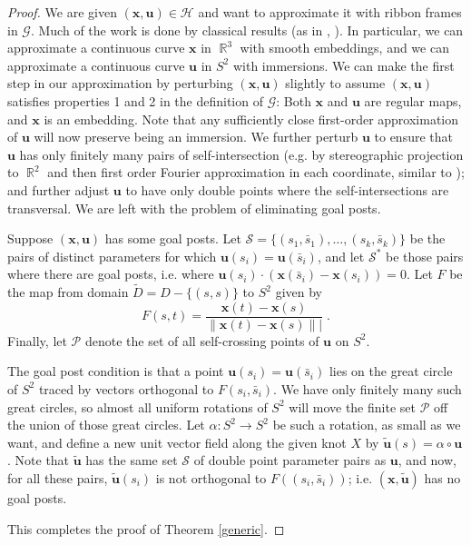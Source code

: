 \documentclass[12pt]{article}
\numberwithin{equation}{subsection}
\theoremstyle{definition}
\numberwithin{lem}{section}
\DeclareMathOperator{\R}{\mathbb{R}}
\def\uu{\mathbf{u}}
\def\x{\mathbf{x}}
\def\bs{\bar{s}}
\def\G{\mathcal{G}}
\def\S{\mathcal{S}}
\def\H{\mathcal{H}}
\def\P{\mathcal{P}}
\begin{document}
\begin{proof}
We are given $(\x, \uu) \in \H$ and want to approximate it with ribbon frames in $\G$. Much of the work is done by classical results (as in \cite{HWhit36}, \cite{JMil07}).  In particular, we can approximate a continuous curve $\x$ in $\R^3$ with smooth embeddings, and we can approximate a continuous curve $\uu$ in $S^2$ with immersions. We can make the first step in our approximation by perturbing $(\x,\uu)$  slightly to assume $(\x,\uu)$ satisfies properties 1 and 2 in the definition of $\G$: Both $\x$ and $\uu$ are regular maps, and $\x$ is an embedding. Note that any sufficiently close first-order approximation of $\uu$ will now preserve being an immersion.
We  further perturb $\uu$ to ensure that $\uu$ has only finitely many pairs of self-intersection (e.g. by stereographic projection to $\R^2$ and then first order Fourier approximation in each coordinate, similar to \cite{AT95, Traut98}); and further adjust $\uu$ to have only double points where the self-intersections are transversal. We are left with the problem of eliminating goal posts.

Suppose $(\mathbf{x}, \mathbf{u})$ has some goal posts.  Let $\S = \{(s_1, \bs_1), \ldots, (s_k, \bs_k)\}$ be the pairs of distinct parameters for which $\uu(s_i) = \uu(\bs_i)$, and let $\S^*$ be those pairs where there are goal posts, i.e. where $\uu(s_i) \cdot (\x(\bs_i)-\x(s_i)) = 0$. Let $F$ be the  map from domain $\tilde{D} = D - \{(s,s)\}$ to $S^2$ given by
$$F(s,t) = \frac{\x(t)-\x(s)}{{\|\x(t)-\x(s)\|}|}\;.$$
Finally, let $\P$ denote the set of all self-crossing points of $\uu$ on $S^2$.

The goal post condition is that a point $\uu(s_i) = \uu(\bs_i)$ lies on the great circle of $S^2$ traced by vectors orthogonal to $F(s_i, \bs_i)$. We have only finitely many such great circles, so almost all uniform rotations of $S^2$ will move the finite set $\P$ off the union of those great circles. Let $\alpha:S^2 \to S^2$ be such a  rotation, as small as we want, and define a new unit vector field along the given knot $X$ by $\tilde{\uu}(s) = \alpha \circ \uu$. Note that $\tilde{\uu}$ has the same set $\S$ of double point parameter pairs as $\uu$, and now, for all these pairs, $\tilde{\uu}(s_i)$ is not orthogonal to $F((s_i, \bs_i))$; i.e. $(\x, \tilde{\uu})$ has no goal posts.

This completes the proof of Theorem \ref{generic}.
\end{proof}

\end{document}
